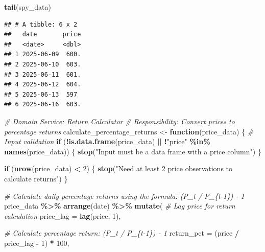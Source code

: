 \documentclass[
]{article}
\newenvironment{Shaded}{\begin{snugshade}}{\end{snugshade}}
\newcommand{\AttributeTok}[1]{\textcolor[rgb]{0.13,0.29,0.53}{#1}}
\newcommand{\CommentTok}[1]{\textcolor[rgb]{0.56,0.35,0.01}{\textit{#1}}}
\newcommand{\ControlFlowTok}[1]{\textcolor[rgb]{0.13,0.29,0.53}{\textbf{#1}}}
\newcommand{\DecValTok}[1]{\textcolor[rgb]{0.00,0.00,0.81}{#1}}
\newcommand{\FunctionTok}[1]{\textcolor[rgb]{0.13,0.29,0.53}{\textbf{#1}}}
\newcommand{\NormalTok}[1]{#1}
\newcommand{\OtherTok}[1]{\textcolor[rgb]{0.56,0.35,0.01}{#1}}
\newcommand{\SpecialCharTok}[1]{\textcolor[rgb]{0.81,0.36,0.00}{\textbf{#1}}}
\newcommand{\StringTok}[1]{\textcolor[rgb]{0.31,0.60,0.02}{#1}}
\begin{document}
\begin{Shaded}
\begin{Highlighting}[]
\FunctionTok{tail}\NormalTok{(spy\_data)}
\end{Highlighting}
\end{Shaded}

\begin{verbatim}
## # A tibble: 6 x 2
##   date       price
##   <date>     <dbl>
## 1 2025-06-09  600.
## 2 2025-06-10  603.
## 3 2025-06-11  601.
## 4 2025-06-12  604.
## 5 2025-06-13  597 
## 6 2025-06-16  603.
\end{verbatim}

\begin{Shaded}
\begin{Highlighting}[]
\CommentTok{\# Domain Service: Return Calculator}
\CommentTok{\# Responsibility: Convert prices to percentage returns}
\NormalTok{calculate\_percentage\_returns }\OtherTok{\textless{}{-}} \ControlFlowTok{function}\NormalTok{(price\_data) \{}
  \CommentTok{\# Input validation}
  \ControlFlowTok{if}\NormalTok{ (}\SpecialCharTok{!}\FunctionTok{is.data.frame}\NormalTok{(price\_data) }\SpecialCharTok{||} \SpecialCharTok{!}\StringTok{"price"} \SpecialCharTok{\%in\%} \FunctionTok{names}\NormalTok{(price\_data)) \{}
    \FunctionTok{stop}\NormalTok{(}\StringTok{"Input must be a data frame with a \textquotesingle{}price\textquotesingle{} column"}\NormalTok{)}
\NormalTok{  \}}
  
  \ControlFlowTok{if}\NormalTok{ (}\FunctionTok{nrow}\NormalTok{(price\_data) }\SpecialCharTok{\textless{}} \DecValTok{2}\NormalTok{) \{}
    \FunctionTok{stop}\NormalTok{(}\StringTok{"Need at least 2 price observations to calculate returns"}\NormalTok{)}
\NormalTok{  \}}
  
  \CommentTok{\# Calculate daily percentage returns using the formula: (P\_t / P\_\{t{-}1\}) {-} 1}
\NormalTok{  price\_data }\SpecialCharTok{\%\textgreater{}\%}
    \FunctionTok{arrange}\NormalTok{(date) }\SpecialCharTok{\%\textgreater{}\%}
    \FunctionTok{mutate}\NormalTok{(}
      \CommentTok{\# Lag price for return calculation}
      \AttributeTok{price\_lag =} \FunctionTok{lag}\NormalTok{(price, }\DecValTok{1}\NormalTok{),}
      
      \CommentTok{\# Calculate percentage return: (P\_t / P\_\{t{-}1\}) {-} 1}
      \AttributeTok{return\_pct =}\NormalTok{ (price }\SpecialCharTok{/}\NormalTok{ price\_lag }\SpecialCharTok{{-}} \DecValTok{1}\NormalTok{) }\SpecialCharTok{*} \DecValTok{100}\NormalTok{,}
      

\end{Highlighting}
\end{Shaded}
\end{document}
